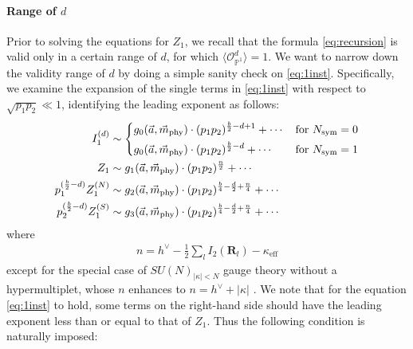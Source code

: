\documentclass[letterpaper, 11pt]{article}
\newcommand{\nn}{\nonumber}
\def\IP{\mathbb{P}}
\def\k{\kappa}
\begin{document}
\paragraph{Range of $d$} 
Prior to solving the equations  for $Z_1$, we recall that the formula \eqref{eq:recursion} is valid only in a certain range of $d$, for which $\langle \mathcal{O}_{\IP^1}^{d}\rangle = 1$. We want to narrow down the validity range of $d$ by doing a simple sanity check on \eqref{eq:1inst}. Specifically, we examine the expansion of the single terms in  \eqref{eq:1inst} with respect to $\sqrt{p_1p_2} \ll 1$, identifying the leading exponent as follows:{\allowdisplaybreaks
\begin{align}
  I_1^{(d)} &\sim \begin{dcases}
    g_0(\vec{a},  \vec{m}_{\text{phy}})\cdot  (p_1p_2)^{\frac{b}{2}-d + 1} + \cdots   &  \text{for }N_\text{sym} = 0\\
    g_0(\vec{a},  \vec{m}_{\text{phy}})\cdot (p_1p_2)^{\frac{b}{2}-d } + \cdots    &  \text{for }N_\text{sym} = 1
\end{dcases}
  \nn \\
  Z_1 &\sim   g_1(\vec{a},  \vec{m}_{\text{phy}})\cdot (p_1p_2)^{\frac{n}{2}}  + \cdots  \nn \\
  p_1^{(\frac{b}{2}-d)}Z_1^{(N)} &\sim  g_2(\vec{a},  \vec{m}_{\text{phy}})\cdot  (p_1p_2)^{\frac{b}{4}-\frac{d}{2}+\frac{n}{4}}   + \cdots   \nn \\
  p_2^{(\frac{b}{2}-d)}  Z^{(S)}_1&\sim  g_3(\vec{a},  \vec{m}_{\text{phy}})\cdot (p_1p_2)^{\frac{b}{4}-\frac{d}{2}+\frac{n}{4}}  + \cdots   
\end{align}
where  
\begin{align}
  n  = 
    \textstyle h^\vee  - \frac{1}{2} \sum_{l}I_2(\mathbf{R}_l) - \k_\text{eff}
\end{align}
except for the special case of $SU(N)_{|\kappa|<N}$ gauge theory without a hypermultiplet, whose $n$ enhances to $n = h^\vee + |\k|$ \cite{Gottsche:2006bm}. We note that for the equation \eqref{eq:1inst} to hold, some terms on the right-hand side should have the leading exponent less than or equal to that of $Z_1$. Thus the following condition is  naturally imposed: 
\begin{align}
  \label{eq:upperbound}

\end{align}}
\end{document}
